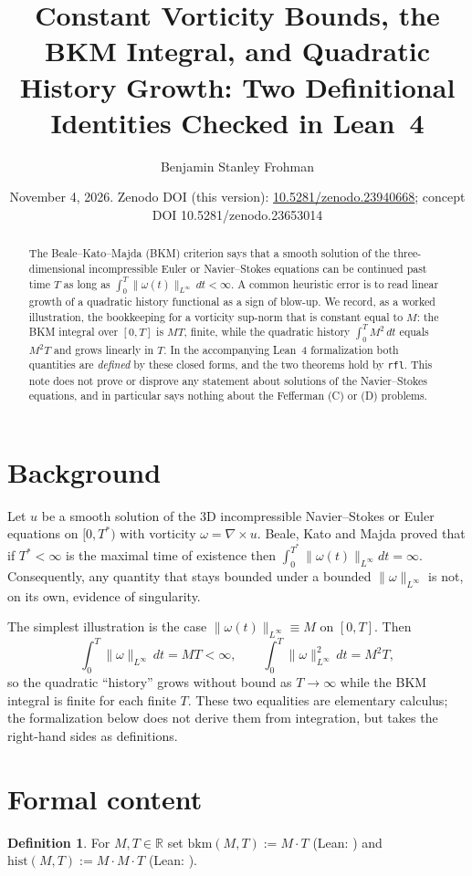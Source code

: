\documentclass[11pt]{amsart}
\title[Constant-bound BKM bookkeeping]{Constant Vorticity Bounds, the BKM Integral, and Quadratic History Growth: Two Definitional Identities Checked in Lean~4}
\author{Benjamin Stanley Frohman}
\date{November 4, 2026. Zenodo DOI (this version): \href{https://doi.org/10.5281/zenodo.23940668}{10.5281/zenodo.23940668}; concept DOI 10.5281/zenodo.23653014}
\theoremstyle{definition}
\newtheorem{definition}[theorem]{Definition}
\theoremstyle{remark}
\newcommand{\lean}[1]{\path{#1}}
\begin{document}
\begin{abstract}
The Beale--Kato--Majda (BKM) criterion says that a smooth solution of the three-dimensional incompressible Euler or Navier--Stokes equations can be continued past time $T$ as long as $\int_0^T\|\omega(t)\|_{L^\infty}\,dt<\infty$. A common heuristic error is to read linear growth of a quadratic history functional as a sign of blow-up. We record, as a worked illustration, the bookkeeping for a vorticity sup-norm that is constant equal to $M$: the BKM integral over $[0,T]$ is $M T$, finite, while the quadratic history $\int_0^T M^2\,dt$ equals $M^2T$ and grows linearly in $T$. In the accompanying Lean~4 formalization both quantities are \emph{defined} by these closed forms, and the two theorems hold by \texttt{rfl}. This note does not prove or disprove any statement about solutions of the Navier--Stokes equations, and in particular says nothing about the Fefferman (C) or (D) problems.
\end{abstract}
\maketitle

\section{Background}
Let $u$ be a smooth solution of the 3D incompressible Navier--Stokes or Euler equations on $[0,T^*)$ with vorticity $\omega=\nabla\times u$. Beale, Kato and Majda \cite{bkm} proved that if $T^*<\infty$ is the maximal time of existence then $\int_0^{T^*}\|\omega(t)\|_{L^\infty}dt=\infty$. Consequently, any quantity that stays bounded under a bounded $\|\omega\|_{L^\infty}$ is not, on its own, evidence of singularity.

The simplest illustration is the case $\|\omega(t)\|_{L^\infty}\equiv M$ on $[0,T]$. Then
\[
\int_0^T\|\omega\|_{L^\infty}\,dt=MT<\infty,\qquad \int_0^T\|\omega\|_{L^\infty}^2\,dt=M^2T,
\]
so the quadratic ``history'' grows without bound as $T\to\infty$ while the BKM integral is finite for each finite $T$. These two equalities are elementary calculus; the formalization below does not derive them from integration, but takes the right-hand sides as definitions.

\section{Formal content}
\begin{definition}
For $M,T\in\mathbb{R}$ set $\mathrm{bkm}(M,T):=M\cdot T$ (Lean: \lean{bkmIntegral}) and $\mathrm{hist}(M,T):=M\cdot M\cdot T$ (Lean: \lean{history}).
\end{definition}
\end{document}
